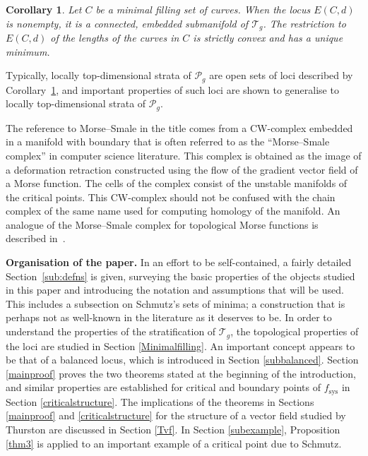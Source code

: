 \documentclass[pdftex]{sigma}
\numberwithin{equation}{section}
\newtheorem{Corollary}[Theorem]{Corollary}
\begin{document}
\begin{Corollary}
\label{thecor}
Let $C$ be a minimal filling set of curves. When the locus $E(C,d)$ is nonempty, it is a connected, embedded submanifold of $\mathcal{T}_{g}$. The restriction to $E(C,d)$ of the lengths of the curves in $C$ is strictly convex and has a unique minimum.
\end{Corollary}

Typically, locally top-dimensional strata of $\mathcal{P}_{g}$ are open sets of loci described by Corollary~\ref{thecor}, and important properties of such loci are shown to generalise to locally top-dimensional strata of $\mathcal{P}_{g}$.

The reference to Morse--Smale in the title comes from a CW-complex embedded in a manifold with boundary that is often referred to as the ``Morse--Smale complex'' in computer science literature. This complex is obtained as the image of a deformation retraction constructed using the flow of the gradient vector field of a Morse function. The cells of the complex consist of the unstable manifolds of the critical points. This CW-complex should not be confused with the chain complex of the same name used for computing homology of the manifold. An analogue of the Morse--Smale complex for topological Morse functions is described in~\cite{Morse}.

\textbf{Organisation of the paper.} In an effort to be self-contained, a fairly detailed Section~\ref{sub:defns} is given, surveying the basic properties of the objects studied in this paper and introducing the notation and assumptions that will be used. This includes a subsection on Schmutz's sets of minima; a construction that is perhaps not as well-known in the literature as it deserves to be. In order to understand the properties of the stratification of $\mathcal{T}_{g}$, the topological properties of the loci are studied in Section \ref{Minimalfilling}. An important concept appears to be that of a balanced locus, which is introduced in Section \ref{subbalanced}. Section \ref{mainproof} proves the two theorems stated at the beginning of the introduction, and similar properties are established for critical and boundary points of $f_{\mathrm{sys}}$ in Section \ref{criticalstructure}. The implications of the theorems in Sections \ref{mainproof} and \ref{criticalstructure} for the structure of a vector field studied by Thurston are discussed in Section \ref{Tvf}. In Section \ref{subexample}, Proposition \ref{thm3} is applied to an important example of a critical point due to Schmutz.
\end{document}
